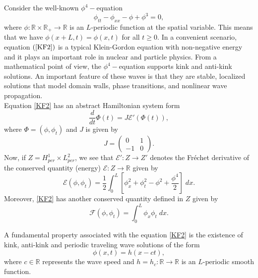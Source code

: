 \documentclass[12pt,reqno,a4paper]{amsart} %
\numberwithin{equation}{section}
\numberwithin{figure}{section}
\begin{document}
Consider the well-known $\phi^4-$equation
\begin{equation}\label{KF2}
\phi_{tt}-\phi_{xx}-\phi+\phi^3=0,
\end{equation}
where $\phi:\mathbb{R} \times \mathbb{R}_+ \rightarrow \mathbb{R}$ is an $L$-periodic function at the spatial variable. This means that we have $\phi(x+L,t)=\phi(x,t)$ for all $t\geq0$. In a convenient scenario, equation $(\ref{KF2})$ is a typical Klein-Gordon equation with non-negative energy and it plays an important role in nuclear and particle physics. From a mathematical point of view, the $\phi^4-$equation supports kink and anti-kink solutions.  An important feature of these waves is that they are stable, localized solutions that model domain walls, phase transitions, and nonlinear wave propagation.\\
\indent Equation \eqref{KF2} has an abstract Hamiltonian system form\begin{equation}\label{hamilt31}
	\frac{d}{dt}\Phi(t)=J \mathcal{E}'(\Phi(t)),
\end{equation}   where $\Phi=(\phi,\phi_t)$ and $J$ is given by
\begin{equation}\label{J}
J=\left(
\begin{array}{cc}
 0 & 1\\
-1 & 0\end{array}
\right).
\end{equation}
 Now, if $Z=H^1_{per}\times L^2_{per} $, we see that $\mathcal{E}':Z\rightarrow Z'$ denotes the Fr\'echet derivative of the conserved quantity (energy) $\mathcal{E}:Z\rightarrow \mathbb{R} $ given by
\begin{equation}\label{E}
\mathcal{E}(\phi, \phi_t)
=\displaystyle\frac{1}{2}\int_{0}^{L} \left[\phi_x^2+\phi_t^2-\phi^2+\frac{\phi^4}{2}\right] \;dx.
\end{equation}
 Moreover, \eqref{KF2} has another conserved quantity defined in $Z$ given by 
\begin{equation}\label{F}
	\mathcal{F}(\phi,\phi_t)=\displaystyle\int_{0}^{L}\phi_x \phi_t \; dx.
\end{equation}



A fundamental property associated with the equation \eqref{KF2} is the existence of kink, anti-kink and periodic traveling wave solutions of the form
\begin{equation}\label{PW}
\phi(x,t)=h(x-ct),
\end{equation}
where $c \in\mathbb{R}$ represents the wave speed and $h=h_c: \mathbb{R}\rightarrow \mathbb{R}$ is an $L$-periodic  smooth function. 
\end{document}
